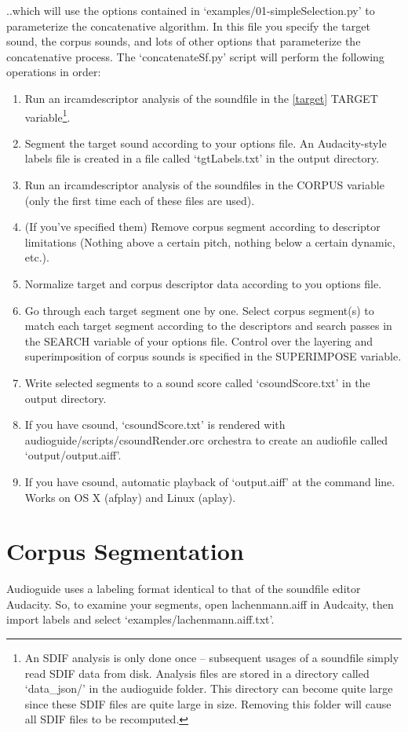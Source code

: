 \documentclass{article}
\begin{document}
\begin{spacing}{1.2}
..which will use the options contained in `examples/01-simpleSelection.py' to parameterize the concatenative algorithm.  In this file you specify the target sound, the corpus sounds, and lots of other options that parameterize the concatenative process.  The `concatenateSf.py' script will perform the following operations in order:
\begin{enumerate}
\item Run an ircamdescriptor analysis of the soundfile in the \ref{target} TARGET variable\footnote{An SDIF analysis is only done once -- subsequent usages of a soundfile simply read SDIF data from disk.  Analysis files are stored in a directory called `data\_json/' in the audioguide folder.  This directory can become quite large since these SDIF files are quite large in size.  Removing this folder will cause all SDIF files to be recomputed.}.  
\item Segment the target sound according to your options file.  An Audacity-style labels file is created in a file called `tgtLabels.txt' in the output directory.
\item Run an ircamdescriptor analysis of the soundfiles in the CORPUS variable (only the first time each of these files are used).
\item (If you've specified them) Remove corpus segment according to descriptor limitations (Nothing above a certain pitch, nothing below a certain dynamic, etc.).
\item Normalize target and corpus descriptor data according to you options file.
\item Go through each target segment one by one.  Select corpus segment(s) to match each target segment according to the descriptors and search passes in the SEARCH variable of your options file.  Control over the layering and superimposition of corpus sounds is specified in the SUPERIMPOSE variable.
\item Write selected segments to a sound score called `csoundScore.txt' in the output directory.
\item If you have csound, `csoundScore.txt' is rendered with audioguide/scripts/csoundRender.orc orchestra to create an audiofile called `output/output.aiff'.
\item If you have csound, automatic playback of `output.aiff' at the command line.  Works on OS X (afplay) and Linux (aplay).
\end{enumerate}


\section{Corpus Segmentation}
Audioguide uses a labeling format identical to that of the soundfile editor Audacity.  So, to examine your segments, open lachenmann.aiff in Audcaity, then import labels and select `examples/lachenmann.aiff.txt'.


\end{spacing}
\end{document}

